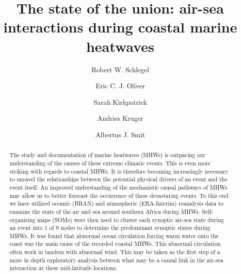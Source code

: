 \documentclass[a4paper,10pt,review]{elsarticle}
\begin{document}
\begin{frontmatter}

\title{The state of the union: air-sea interactions during coastal marine heatwaves}

\author[firstaddress]{Robert W. Schlegel}
\author[secondaddress,thirdaddress]{Eric C. J. Oliver}
\author[fourthaddress]{Sarah Kirkpatrick}
\author[fifthaddress,sixthaddress]{Andries Kruger}
\author[firstaddress]{Albertus J. Smit}



\address[firstaddress]{Department of Biodiversity and Conservation Biology, University of the Western Cape, Private Bag X17, Bellville 7535, South Africa}

\address[secondaddress]{ARC Centre of Excellence for Climate System Science, Australia}

\address[thirdaddress]{Institute for Marine and Antarctic Studies, University of Tasmania, Hobart, Australia}

\address[fourthaddress]{UWA Oceans Institute and School of Plant Biology, The University of Western Australia, Crawley, 6009 Western Australia, Australia}

\address[fifthaddress]{Climate Service, South African Weather Service, Pretoria, South Africa}

\address[sixthaddress]{Department of Geography, Geoinformatics and Meteorology, Faculty of Natural and Agricultural Sciences, University of Pretoria, South Africa}


\begin{abstract}
The study and documentation of marine heatwaves (MHWs) is outpacing our understanding of the causes of these extreme climatic events. This is even more striking with regards to coastal MHWs. It is therefore becoming increasingly necessary to unravel the relationships between the potential physical drivers of an event and the event itself. An improved understanding of the mechanistic causal pathways of MHWs may allow us to better forecast the occurrence of these devastating events. To this end we have utilized oceanic (BRAN) and atmospheric (ERA-Interim) reanalysis data to examine the state of the air and sea around southern Africa during MHWs. Self-organising maps (SOMs) were then used to cluster each synoptic air-sea state during an event into 1 of 9 nodes to determine the predominant synoptic states during MHWs. It was found that abnormal ocean circulation forcing warm water onto the coast was the main cause of the recorded coastal MHWs. This abnormal circulation often work in tandem with abnormal wind. This may be taken as the first step of a more in depth exploratory analysis between what may be a causal link in the air-sea interaction at these mid-latitude locations.
\end{abstract}


\end{frontmatter}
\end{document}

